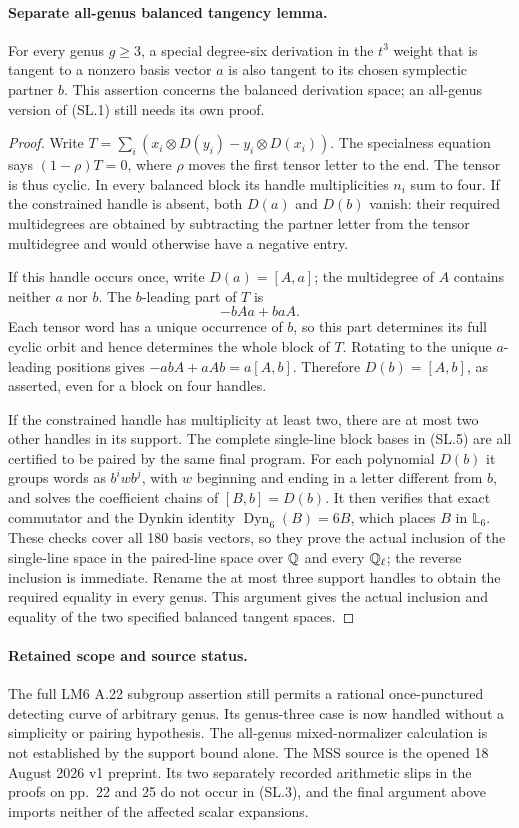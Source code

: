 \paragraph{Separate all-genus balanced tangency lemma.}
For every genus $g\geq3$, a special degree-six derivation in
the $t^3$ weight that is tangent to a nonzero basis vector
$a$ is also tangent to its chosen symplectic partner $b$.
This assertion concerns the balanced derivation space; an
all-genus version of (SL.1) still needs its own proof.

\begin{proof}
Write $T=\sum_i(x_i\otimes D(y_i)-y_i\otimes D(x_i))$.
The specialness equation says $(1-\rho)T=0$, where $\rho$
moves the first tensor letter to the end. The tensor is thus
cyclic. In every balanced block its handle multiplicities
$n_i$ sum to four. If the constrained handle is absent,
both $D(a)$ and $D(b)$ vanish: their required multidegrees
are obtained by subtracting the partner letter from the
tensor multidegree and would otherwise have a negative entry.

If this handle occurs once, write $D(a)=[A,a]$; the
multidegree of $A$ contains neither $a$ nor $b$. The
$b$-leading part of $T$ is
\[
                      -bAa+baA.
\]
Each tensor word has a unique occurrence of $b$, so this
part determines its full cyclic orbit and hence determines
the whole block of $T$. Rotating to the unique $a$-leading
positions gives $-abA+aAb=a[A,b]$. Therefore
$D(b)=[A,b]$, as asserted, even for a block on four handles.

If the constrained handle has multiplicity at least two,
there are at most two other handles in its support. The
complete single-line block bases in (SL.5) are all
certified to be paired by the same final program.
For each polynomial $D(b)$ it groups words as
$b^i w b^j$, with $w$ beginning and ending in a letter
different from $b$, and solves the coefficient chains of
$[B,b]=D(b)$. It then verifies that exact commutator and
the Dynkin identity $\operatorname{Dyn}_6(B)=6B$, which
places $B$ in $\mathbb L_6$. These checks cover all 180
basis vectors, so they prove the actual inclusion of the
single-line space in the paired-line space over $\mathbb Q$ and
every $\mathbb Q_\ell$; the reverse inclusion is immediate.
Rename the at most three support
handles to obtain the required equality in every genus.
This argument gives the actual inclusion and equality of
the two specified balanced tangent spaces.
\end{proof}

\paragraph{Retained scope and source status.}
The full LM6 A.22 subgroup assertion still permits a rational
once-punctured detecting curve of arbitrary genus. Its genus-three
case is now handled without a simplicity or pairing hypothesis.
The all-genus mixed-normalizer calculation is not established
by the support bound alone. The MSS source is the opened
18 August 2026 v1 preprint. Its two separately recorded arithmetic
slips in the proofs on pp.~22 and 25 do not occur in (SL.3),
and the final argument above imports neither of the affected
scalar expansions.

